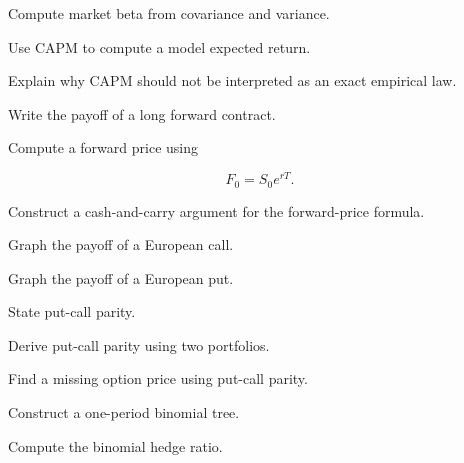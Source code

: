 \begin{exercise}[2]
Compute market beta from covariance and variance.
\end{exercise}

\begin{exercise}[3]
Use CAPM to compute a model expected return.
\end{exercise}

\begin{exercise}[3]
Explain why CAPM should not be interpreted as an exact empirical law.
\end{exercise}

\begin{exercise}[2]
Write the payoff of a long forward contract.
\end{exercise}

\begin{exercise}[2]
Compute a forward price using

\[
F_0=S_0e^{rT}.
\]
\end{exercise}

\begin{exercise}[3]
Construct a cash-and-carry argument for the forward-price formula.
\end{exercise}

\begin{exercise}[2]
Graph the payoff of a European call.
\end{exercise}

\begin{exercise}[2]
Graph the payoff of a European put.
\end{exercise}

\begin{exercise}[2]
State put-call parity.
\end{exercise}

\begin{exercise}[3]
Derive put-call parity using two portfolios.
\end{exercise}

\begin{exercise}[3]
Find a missing option price using put-call parity.
\end{exercise}

\begin{exercise}[2]
Construct a one-period binomial tree.
\end{exercise}

\begin{exercise}[3]
Compute the binomial hedge ratio.
\end{exercise}


